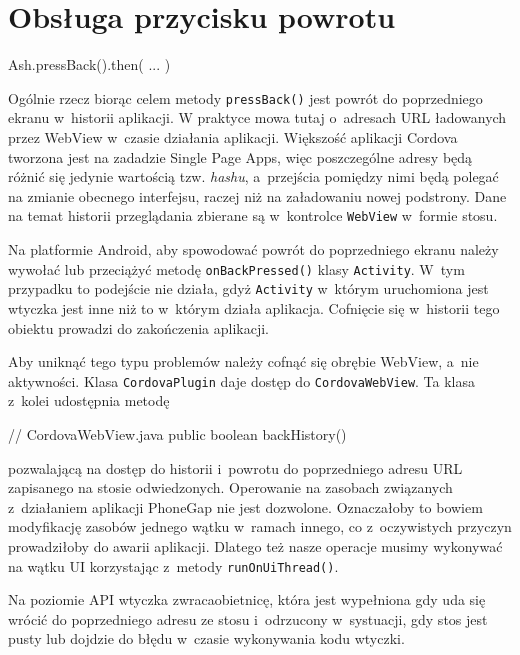 \documentclass[brudnopis]{xmgr}
\begin{document}
\section{Obsługa przycisku powrotu}

\begin{javascriptcode}
   Ash.pressBack().then( ... ) 
\end{javascriptcode}

Ogólnie rzecz biorąc celem metody \texttt{pressBack()} jest powrót do poprzedniego ekranu w~historii aplikacji. W praktyce mowa tutaj o~adresach URL ładowanych przez WebView w~czasie działania aplikacji. Większość aplikacji Cordova tworzona jest na zadadzie Single Page Apps, więc poszczególne adresy będą różnić się jedynie wartością tzw. \textit{hashu}, a~przejścia pomiędzy nimi będą polegać na zmianie obecnego interfejsu, raczej niż na załadowaniu nowej podstrony. Dane na temat historii przeglądania zbierane są w~kontrolce \texttt{WebView} w~formie stosu.

Na platformie Android, aby spowodować powrót do poprzedniego ekranu należy wywołać lub przeciążyć metodę \texttt{onBackPressed()} klasy \texttt{Activity}. W~tym przypadku to podejście nie działa, gdyż \texttt{Activity} w~którym uruchomiona jest wtyczka jest inne niż to w~którym działa aplikacja. Cofnięcie się w~historii tego obiektu prowadzi do zakończenia aplikacji. 

Aby uniknąć tego typu problemów należy cofnąć się obrębie WebView, a~nie aktywności. Klasa \texttt{CordovaPlugin} daje dostęp do \texttt{CordovaWebView}. Ta klasa z~kolei udostępnia metodę 

\begin{javacode}
    // CordovaWebView.java
    public boolean backHistory()
\end{javacode}

\noindent pozwalającą na dostęp do historii i~powrotu do poprzedniego  adresu URL zapisanego na stosie odwiedzonych. Operowanie na zasobach związanych z~działaniem aplikacji PhoneGap nie jest dozwolone. Oznaczałoby to bowiem modyfikację zasobów jednego wątku w~ramach innego, co z~oczywistych przyczyn prowadziłoby do awarii aplikacji. Dlatego też nasze operacje musimy wykonywać na wątku UI korzystając z~metody \texttt{runOnUiThread()}.

Na poziomie API wtyczka zwracaobietnicę, która jest wypełniona gdy uda się wrócić do poprzedniego adresu ze stosu i~odrzucony w~systuacji, gdy stos jest pusty lub dojdzie do błędu w~czasie wykonywania kodu wtyczki.
\end{document}

